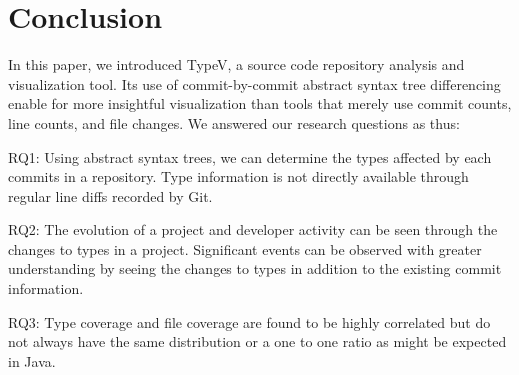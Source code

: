 \section{Conclusion}

In this paper, we introduced TypeV, a source code repository analysis and visualization tool. Its use of commit-by-commit abstract syntax tree differencing enable for more insightful visualization than tools that merely use commit counts, line counts, and file changes. We answered our research questions as thus:

RQ1: Using abstract syntax trees, we can determine the types affected by each commits in a repository. Type information is not directly available through regular line diffs recorded by Git.

RQ2: The evolution of a project and developer activity can be seen through the changes to types in a project. Significant events can be observed with greater understanding by seeing the changes to types in addition to the existing commit information.

RQ3: Type coverage and file coverage are found to be highly correlated but do not always have the same distribution or a one to one ratio as might be expected in Java.





